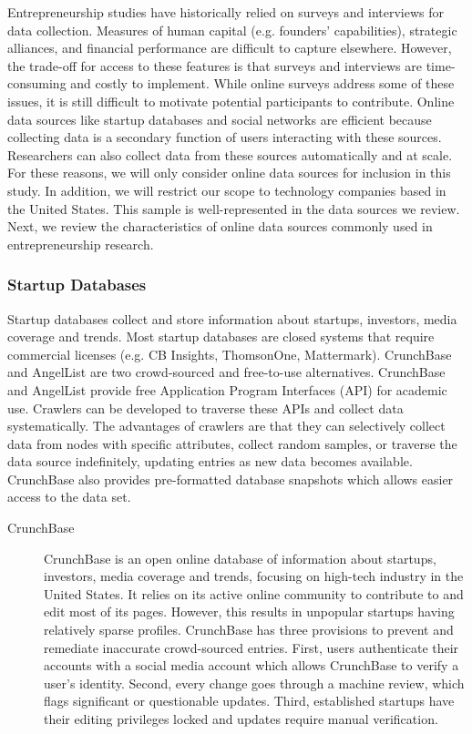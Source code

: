 \documentclass[../thesis/thesis.tex]{subfiles}
\begin{document}
\begin{refsection}
Entrepreneurship studies have historically relied on surveys and interviews for data collection. Measures of human capital (e.g. founders' capabilities), strategic alliances, and financial performance are difficult to capture elsewhere. However, the trade-off for access to these features is that surveys and interviews are time-consuming and costly to implement. While online surveys address some of these issues, it is still difficult to motivate potential participants to contribute. Online data sources like startup databases and social networks are efficient because collecting data is a secondary function of users interacting with these sources. Researchers can also collect data from these sources automatically and at scale. For these reasons, we will only consider online data sources for inclusion in this study. In addition, we will restrict our scope to technology companies based in the United States. This sample is well-represented in the data sources we review. Next, we review the characteristics of online data sources commonly used in entrepreneurship research.

\subsubsection{Startup Databases}

Startup databases collect and store information about startups, investors, media coverage and trends. Most startup databases are closed systems that require commercial licenses (e.g. CB Insights, ThomsonOne, Mattermark). CrunchBase and AngelList are two crowd-sourced and free-to-use alternatives. CrunchBase and AngelList provide free Application Program Interfaces (API) for academic use. Crawlers can be developed to traverse these APIs and collect data systematically. The advantages of crawlers are that they can selectively collect data from nodes with specific attributes, collect random samples, or traverse the data source indefinitely, updating entries as new data becomes available. CrunchBase also provides pre-formatted database snapshots which allows easier access to the data set.

\begin{description}

\item[CrunchBase]

CrunchBase is an open online database of information about startups, investors, media coverage and trends, focusing on high-tech industry in the United States. It relies on its active online community to contribute to and edit most of its pages. However, this results in unpopular startups having relatively sparse profiles. CrunchBase has three provisions to prevent and remediate inaccurate crowd-sourced entries. First, users authenticate their accounts with a social media account which allows CrunchBase to verify a user's identity. Second, every change goes through a machine review, which flags significant or questionable updates. Third, established startups have their editing privileges locked and updates require manual verification.


\end{description}
\end{refsection}
\end{document}

